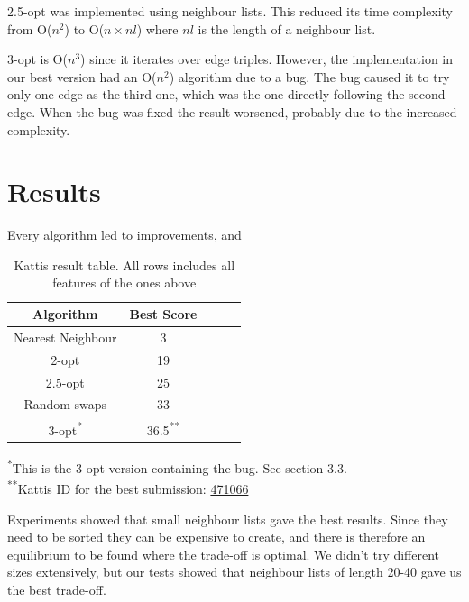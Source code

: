 \documentclass[paper=a4, fontsize=11pt,numbers=endperiod]{scrartcl} %
\numberwithin{equation}{section} %
\numberwithin{figure}{section} %
\numberwithin{table}{section} %
\begin{document}
2.5-opt was implemented using neighbour lists.
This reduced its time complexity from O($n^2$) to O($n\times nl$) where $nl$ is the length of a neighbour list.

3-opt is O($n^3$) since it iterates over edge triples.
However, the implementation in our best version had an O($n^2$) algorithm due to a bug.
The bug caused it to try only one edge as the third one, which was the one directly following the second edge.
When the bug was fixed the result worsened, probably due to the increased complexity.


\newpage
\section{Results}

Every algorithm led to improvements, and 

\begin{table}[h]
  \centering
    \begin{tabular}{|c|c|c|c|c|}
    \hline
    \textbf{Algorithm} & \textbf{Best Score} \\ \hline
    Nearest Neighbour & 3 \\ \hline
    2-opt & 19 \\ \hline
    2.5-opt & 25 \\ \hline
    Random swaps & 33 \\ \hline
    3-opt\textsuperscript{*} & 36.5\textsuperscript{**} \\ \hline
    \end{tabular}
    \caption{Kattis result table. All rows includes all features of the ones above}
    \hspace{10pt}
  \end{table}

\textsuperscript{*}This is the 3-opt version containing the bug. See section 3.3.\\
\textsuperscript{**}Kattis ID for the best submission: \href{https://kth.kattis.scrool.se/submission?id=471066}{471066}

Experiments showed that small neighbour lists gave the best results. Since they need to be sorted they can be expensive to create, and there is therefore an equilibrium to be found where the trade-off is optimal. We didn't try different sizes extensively, but our tests showed that neighbour lists of length 20-40 gave us the best trade-off.
\end{document}

